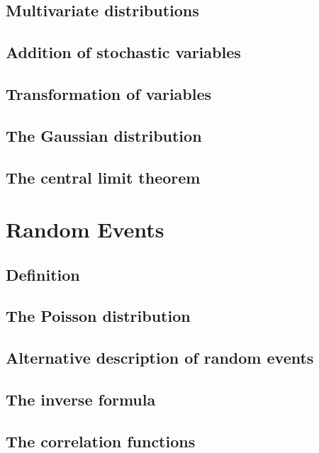 \documentclass{book}
\numberwithin{equation}{section}
\theoremstyle{plain}
\theoremstyle{definition}
\theoremstyle{remark}
\theoremstyle{BoldStyle}
\numberwithin{exercise}{section}
\begin{document}
\section{Multivariate distributions}

\section{Addition of stochastic variables}

\section{Transformation of variables}

\section{The Gaussian distribution}

\section{The central limit theorem}




\chapter{Random Events}

\section{Definition}

\section{The Poisson distribution}

\section{Alternative description of random events}

\section{The inverse formula}

\section{The correlation functions}
\end{document}
